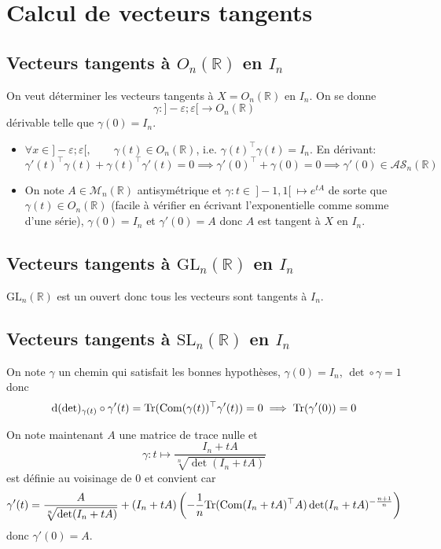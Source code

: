 \section{Calcul de vecteurs tangents}

\subsection{Vecteurs tangents à $O_n(\mathbb R)$ en $I_n$}

On veut déterminer les vecteurs tangents à $X=O_n(\mathbb R)$ en $I_n$. On se donne \[
    \gamma: ]-\varepsilon; \varepsilon[ \longrightarrow O_n(\mathbb R)
\]
dérivable telle que $\gamma (0)=I_n$. \begin{itemize}
    \item $\forall x\in ]-\varepsilon; \varepsilon[, \qquad \gamma(t)\in O_n(\mathbb R)$, i.e. $\gamma(t)^{\top}\gamma(t)=I_n$. En dérivant: \[
            \gamma'(t)^\top\gamma(t)+\gamma(t)^\top\gamma'(t)=0\implies \gamma'(0)^\top+\gamma(0)=0 \implies \gamma'(0)\in \mathcal{AS}_n(\mathbb R)
        \]
    \item On note $A\in\mathcal M_n(\mathbb R)$ antisymétrique et $\gamma:t\in ~]-1, 1[~\longmapsto e^{tA}$ de sorte que $\gamma(t)\in O_n(\mathbb R)$ (facile à vérifier en écrivant l'exponentielle comme somme d'une série), $\gamma(0)=I_n$ et $\gamma'(0)=A$ donc $A$ est tangent à $X$ en $I_n$.
\end{itemize}

\subsection{Vecteurs tangents à $\mathrm{GL}_n(\mathbb R)$ en $I_n$}

$\mathrm{GL}_n(\mathbb R)$ est un ouvert donc tous les vecteurs sont tangents à $I_n$.

\subsection{Vecteurs tangents à $\mathrm{SL}_n(\mathbb R)$ en $I_n$}

On note $\gamma$ un chemin qui satisfait les bonnes hypothèses, $\gamma(0)=I_n$, $\det \circ \gamma =1$ donc \[
    \mathrm{d} (\det)_{\gamma(t)}\circ \gamma'(t)=\mathrm{Tr}(\mathrm{Com}(\gamma(t))^\top \gamma'(t))=0 \implies \mathrm{Tr}(\gamma'(0))=0
\]

On note maintenant $A$ une matrice de trace nulle et \[
    \gamma: t\longmapsto \frac{I_n+tA}{\sqrt[n]{\det(I_n+tA)}}
\]
est définie au voisinage de $0$ et convient car \[
    \gamma'(t)=\frac{A}{\sqrt[n]{\det(I_n+tA)}}+(I_n+tA) \left( - \frac{1}{n} \mathrm{Tr}(\mathrm{Com}(I_n+tA)^\top A)\det(I_n+tA)^{- \frac{n+1}{n} } \right)
\]
donc $\gamma'(0)=A$.

